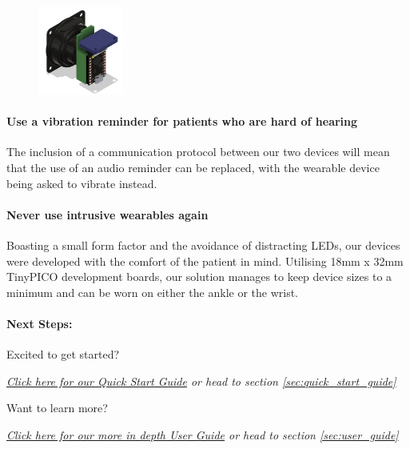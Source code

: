 		\begin{figure}
			\vspace{-1em}
			\centering
			\includegraphics[width=0.25\textwidth]{graphics/hardware.png}
		\end{figure}

		\paragraph{Use a vibration reminder for patients who are hard of hearing}\mbox{}

		The inclusion of a communication protocol between our two devices will mean that the use of an audio reminder can be replaced, with the wearable device being asked to vibrate instead.

		\paragraph{Never use intrusive wearables again}\mbox{}

		Boasting a small form factor and the avoidance of distracting LEDs, our devices were developed with the comfort of the patient in mind. Utilising 18mm x 32mm TinyPICO development boards, our solution manages to keep device sizes to a minimum and can be worn on either the ankle or the wrist. 

		\paragraph{Next Steps:}\mbox{}

		\vspace{1em}
		Excited to get started?

		\textit{\hyperref[sec:quick_start_guide]{Click here for our Quick Start Guide} or head to section \ref{sec:quick_start_guide}}

		\vspace{1em}
		Want to learn more?

		\textit{\hyperref[sec:user_guide]{Click here for our more in depth User Guide} or head to section \ref{sec:user_guide}}

